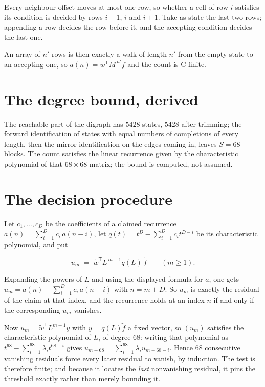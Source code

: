 \documentclass[11pt]{article}
\theoremstyle{definition}
\begin{document}
Every neighbour offset moves at most one row, so whether a cell of row $i$ satisfies its condition is decided by rows $i-1$, $i$ and $i+1$. Take as state the last two rows; appending a row decides the row before it, and the accepting condition decides the last one.

An array of $n'$ rows is then exactly a walk of length $n'$ from the empty state to an accepting one, so $a(n) = w^{\mathsf T}M^{\,n'}f$ and the count is C-finite.

\section{The degree bound, derived}

The reachable part of the digraph has $5428$ states, $5428$ after trimming; the forward identification of states with equal numbers of completions of every length, then the mirror identification on the edges coming in, leaves $S = 68$ blocks. The count satisfies the linear recurrence given by the characteristic polynomial of that $68\times68$ matrix; the bound is computed, not assumed.

\section{The decision procedure}

Let $c_1,\dots,c_D$ be the coefficients of a claimed recurrence $a(n) = \sum_{i=1}^{D} c_i\,a(n-i)$, let $q(t) = t^{D} - \sum_{i=1}^{D} c_i t^{D-i}$ be its characteristic polynomial, and put

\[u_m \;=\; \tilde w^{\mathsf T} L^{\,m-1} q(L)\,\tilde f \qquad (m \ge 1).\]

Expanding the powers of $L$ and using the displayed formula for $a$, one gets $u_m = a(n) - \sum_{i=1}^{D} c_i\,a(n-i)$ with $n = m + D$. So $u_m$ is exactly the residual of the claim at that index, and the recurrence holds at an index $n$ if and only if the corresponding $u_m$ vanishes.

Now $u_m = \tilde w^{\mathsf T} L^{m-1} y$ with $y = q(L)\tilde f$ a fixed vector, so $(u_m)$ satisfies the characteristic polynomial of $L$, of degree $68$: writing that polynomial as $t^{68} - \sum_{i=1}^{68} \lambda_i t^{68-i}$ gives $u_{m+68} = \sum_{i=1}^{68} \lambda_i u_{m+68-i}$. Hence $68$ consecutive vanishing residuals force every later residual to vanish, by induction. The test is therefore finite; and because it locates the {\itshape last} nonvanishing residual, it pins the threshold exactly rather than merely bounding it.
\end{document}
